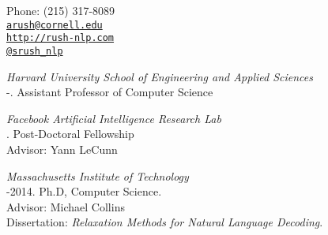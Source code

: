 \documentclass[11pt]{article}
\makeatletter
\def\myemail{arush@cornell.edu}
\def\myweb{http://rush-nlp.com}
\def\myphone{(215) 317-8089}
\def\myfax{srush\_nlp}
\makeatother
\begin{document}
\begin{minipage}[t]{2.95in}


\end{minipage}
\hfill
\hfill
\begin{minipage}[t]{1.7in}
  \flushright \footnotesize Phone: \myphone \\
  {\scriptsize  \texttt{\href{mailto:\myemail}{\myemail}}} \\
  {\scriptsize  \texttt{\href{\myweb}{\myweb}}} \\
  {\scriptsize  \texttt{\href{http://twitter.com/\myfax}{@\myfax}}} \\
\end{minipage}


\medskip

\reversemarginpar

\medskip


\noindent\emph{Harvard University School of Engineering and Applied Sciences \vspace{0.01in}}\\
-.  Assistant Professor of Computer Science

\medskip
\noindent\emph{Facebook Artificial Intelligence Research Lab \vspace{0.01in}}\\
.  Post-Doctoral Fellowship\\
\ind Advisor: Yann LeCunn

\bigskip



\noindent\emph{Massachusetts Institute of Technology \vspace{0.01in}}\\
-2014.  Ph.D, Computer Science.\\
\ind Advisor: Michael Collins\\
\ind Dissertation: \emph{Relaxation Methods for Natural Language Decoding}. %
\end{document}
